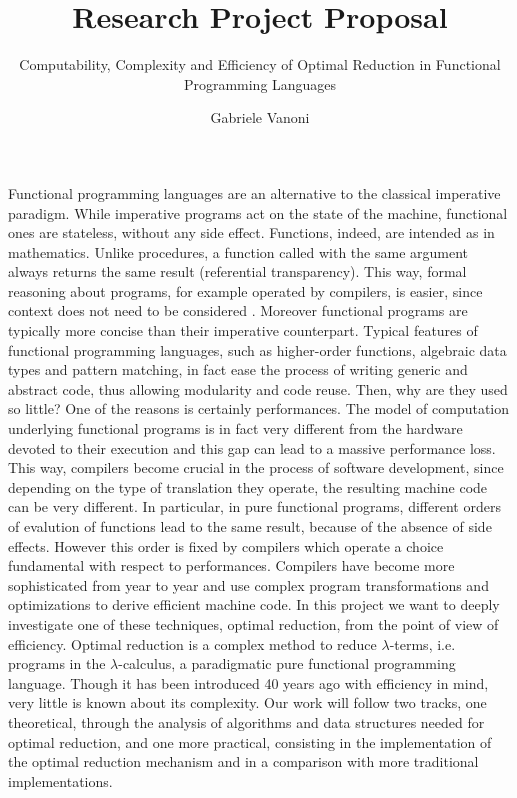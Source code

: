 \documentclass[english]{scrartcl}
\begin{document}
\title{Research Project Proposal}
\subtitle{Computability, Complexity and Efficiency of Optimal Reduction in Functional Programming Languages}
\author{Gabriele Vanoni}
\date{}
\maketitle
Functional programming languages are an alternative to the classical imperative paradigm. While imperative programs act on the state of the machine, functional ones are stateless, without any side effect. Functions, indeed, are intended as in mathematics. Unlike procedures, a function called with the same argument always returns the same result (referential transparency). This way, formal reasoning about programs, for example operated by compilers, is easier, since context does not need to be considered \cite{backus_can_1978}. Moreover functional programs are typically more concise than their imperative counterpart. Typical features of functional programming languages, such as higher-order functions, algebraic data types and pattern matching, in fact ease the process of writing generic and abstract code, thus allowing modularity and code reuse. Then, why are they used so little? One of the reasons is certainly performances. The model of computation underlying functional programs is in fact very different from the hardware devoted to their execution and this gap can lead to a massive performance loss. This way, compilers become crucial in the process of software development, since depending on the type of translation they operate, the resulting machine code can be very different. In particular, in pure functional programs, different orders of evalution of functions lead to the same result, because of the absence of side effects. However this order is fixed by compilers which operate a choice fundamental with respect to performances. Compilers have become more sophisticated from year to year and use complex program transformations and optimizations to derive efficient machine code. In this project we want to deeply investigate one of these techniques, optimal reduction, from the point of view of efficiency. Optimal reduction is a complex method to reduce $\lambda$-terms, i.e. programs in the $\lambda$-calculus, a paradigmatic pure functional programming language. Though it has been introduced 40 years ago with efficiency in mind, very little is known about its complexity. Our work will follow two tracks, one theoretical, through the analysis of algorithms and data structures needed for optimal reduction, and one more practical, consisting in the implementation of the optimal reduction mechanism and in a comparison with more traditional implementations.
\end{document}

